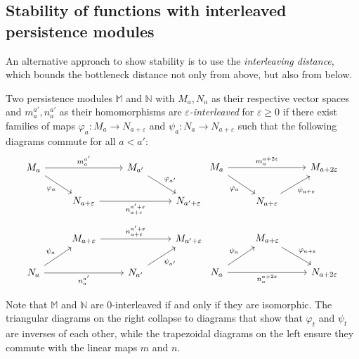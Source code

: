 \subsection{Stability of functions with interleaved persistence modules}

An alternative approach to show stability is to use the \emph{interleaving
distance}, which bounds the bottleneck distance not only from above, but also
from below.
\begin{definition}
    \label{def:interleaving}
    Two persistence modules $\mathbb{M}$ and $\mathbb{N}$ with $M_a, N_a$ as
    their respective vector spaces and $m_a^{a'}, n_a^{a'}$ as their
    homomorphisms are \emph{$\varepsilon$-interleaved}
    for $\varepsilon \geq 0$ if there exist families of maps $\varphi_a : M_a
    \to N_{a + \varepsilon}$ and $\psi_a : N_a \to N_{a + \varepsilon}$
    such that the following diagrams commute for all $a < a'$:
    \begin{equation*}
        \begin{tikzcd}
            M_a \arrow{rr}{m_a^{a'}} \arrow{dr}[swap]{\varphi_a} & & M_{a'} \arrow{dr}{\varphi_{a'}} \\
            & N_{a + \varepsilon} \arrow{rr}[swap]{n_{a + \varepsilon}^{a' + \varepsilon}} & & N_{a' + \varepsilon}
        \end{tikzcd}
        \begin{tikzcd}
            M_a \arrow{dr}[swap]{\varphi_a} \arrow{rr}{m_a^{a + 2\varepsilon}} && M_{a + 2\varepsilon} \\
            & N_{a + \varepsilon} \arrow{ur}[swap]{\psi_{a + \varepsilon}}
        \end{tikzcd}
    \end{equation*}
    \begin{equation*}
        \begin{tikzcd}
            & M_{a + \varepsilon} \arrow{rr}{n_{a + \varepsilon}^{a' + \varepsilon}} & & M_{a' + \varepsilon} \\
            N_a \arrow{rr}[swap]{n_a^{a'}} \arrow{ur}{\psi_a} & & N_{a'} \arrow{ur}[swap]{\psi_{a'}}
        \end{tikzcd}
        \begin{tikzcd}
            & M_{a + \varepsilon} \arrow{dr}{\varphi_{a + \varepsilon}} \\
            N_a \arrow{ur}{\psi_a} \arrow{rr}[swap]{n_a^{a + 2\varepsilon}} && N_{a + 2\varepsilon}
        \end{tikzcd}
    \end{equation*}
\end{definition}
Note that $\mathbb{M}$ and $\mathbb{N}$ are $0$-interleaved if and only if
they are isomorphic. The triangular diagrams on the right collapse to diagrams
that show that $\varphi_t$ and $\psi_t$ are inverses of each other, while
the trapezoidal diagrams on the left ensure they commute with the linear maps
$m$ and $n$.

